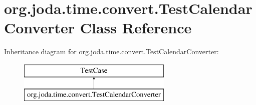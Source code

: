 \hypertarget{classorg_1_1joda_1_1time_1_1convert_1_1_test_calendar_converter}{\section{org.\-joda.\-time.\-convert.\-Test\-Calendar\-Converter Class Reference}
\label{classorg_1_1joda_1_1time_1_1convert_1_1_test_calendar_converter}
}
Inheritance diagram for org.\-joda.\-time.\-convert.\-Test\-Calendar\-Converter\-:\begin{figure}[H]
\begin{center}
\leavevmode
\includegraphics[height=2.000000cm]{classorg_1_1joda_1_1time_1_1convert_1_1_test_calendar_converter}
\end{center}
\end{figure}
